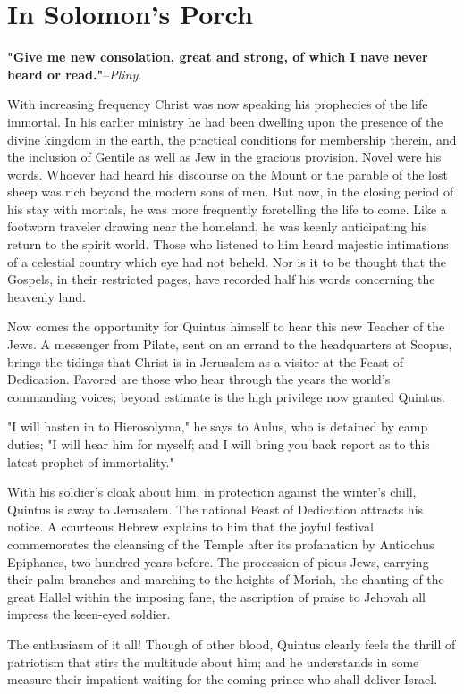 \chapter*{In Solomon's Porch}
\textbf{"Give me new consolation, great and strong, of which I nave never
heard or read."}--\textit{Pliny}.

With increasing frequency Christ was now speaking his prophecies of
the life immortal.  In his earlier ministry he had been dwelling
upon the presence of the divine kingdom in the earth, the practical
conditions for membership therein, and the inclusion of Gentile as
well as Jew in the gracious provision.  Novel were his words.
Whoever had heard his discourse on the Mount or the parable of the
lost sheep was rich beyond the modern sons of men.  But now, in the
closing period of his stay with mortals, he was more frequently
foretelling the life to come.  Like a footworn traveler drawing
near the homeland, he was keenly anticipating his return to the
spirit world.  Those who listened to him heard majestic intimations
of a celestial country which eye had not beheld.  Nor is it to be
thought that the Gospels, in their restricted pages, have recorded
half his words concerning the heavenly land.

Now comes the opportunity for Quintus himself to hear this new
Teacher of the Jews.  A messenger from Pilate, sent on an errand to
the headquarters at Scopus, brings the tidings that Christ is in
Jerusalem as a visitor at the Feast of Dedication.  Favored are
those who hear through the years the world's commanding voices;
beyond estimate is the high privilege now granted Quintus.

"I will hasten in to Hierosolyma," he says to Aulus, who is
detained by camp duties; "I will hear him for myself; and I will
bring you back report as to this latest prophet of immortality."


With his soldier's cloak about him, in protection against the
winter's chill, Quintus is away to Jerusalem.  The national Feast
of Dedication attracts his notice.  A courteous Hebrew explains to
him that the joyful festival commemorates the cleansing of the
Temple after its profanation by Antiochus Epiphanes, two hundred
years before.  The procession of pious Jews, carrying their palm
branches and marching to the heights of Moriah, the chanting of the
great Hallel within the imposing fane, the ascription of praise to
Jehovah all impress the keen-eyed soldier.

The enthusiasm of it all!  Though of other blood, Quintus clearly
feels the thrill of patriotism that stirs the multitude about him;
and he understands in some measure their impatient waiting for the
coming prince who shall deliver Israel.


